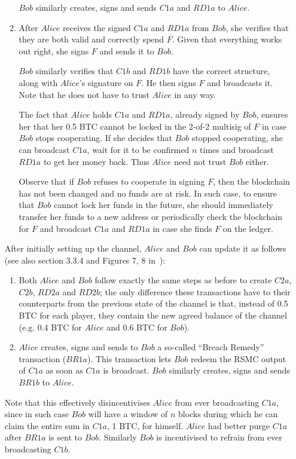 \begin{itemize}
\begin{enumerate}
      $Bob$ similarly creates, signs and sends $C1a$ and $RD1a$ to $Alice$.

      \item After $Alice$ receives the signed $C1a$ and $RD1a$ from $Bob$, she verifies
      that they are both valid and correctly spend $F$. Given that everything works out
      right, she signs $F$ and sends it to $Bob$.

      $Bob$ similarly verifies that $C1b$ and $RD1b$ have the correct structure, along
      with $Alice$'s signature on $F$. He then signs $F$ and broadcasts it. Note that he
      does not have to trust $Alice$ in any way.

      The fact that $Alice$ holds $C1a$ and $RD1a$, already signed by $Bob$, ensures her
      that her 0.5 BTC cannot be locked in the 2-of-2 multisig of $F$ in case $Bob$ stops
      cooperating. If she decides that $Bob$ stopped cooperating, she can broadcast $C1a$,
      wait for it to be confirmed $n$ times and broadcast $RD1a$ to get her money back.
      Thus $Alice$ need not trust $Bob$ either.

      Observe that if $Bob$ refuses to cooperate in signing $F$, then the blockchain has
      not been changed and no funds are at risk. In such case, to ensure that $Bob$ cannot
      lock her funds in the future, she should immediately transfer her funds to a new
      address or periodically check the blockchain for $F$ and broadcast $C1a$ and $RD1a$
      in case she finds $F$ on the ledger.

    \end{enumerate}

    After initially setting up the channel, $Alice$ and $Bob$ can update it as follows
    (see also section 3.3.4 and Figures 7, 8 in~\cite{lightning}):
    \begin{enumerate}
      \item Both $Alice$ and $Bob$ follow exactly the same steps as before to create
      $C2a$, $C2b$, $RD2a$ and $RD2b$; the only difference these transactions have to
      their counterparts from the previous state of the channel is that, instead of 0.5
      BTC for each player, they contain the new agreed balance of the channel (e.g. 0.4
      BTC for $Alice$ and 0.6 BTC for $Bob$).

      \item $Alice$ creates, signs and sends to $Bob$ a so-called ``Breach Remedy''
      transaction ($BR1a$). This transaction lets $Bob$ redeem the RSMC output of $C1a$ as
      soon as $C1a$ is broadcast. $Bob$ similarly creates, signs and sends $BR1b$ to
      $Alice$.
    \end{enumerate}
    Note that this effectively disincentivises $Alice$ from ever broadcasting $C1a$, since
    in such case $Bob$ will have a window of $n$ blocks during which he can claim the
    entire sum in $C1a$, 1 BTC, for himself. $Alice$ had better purge $C1a$ after $BR1a$
    is sent to $Bob$. Similarly $Bob$ is incentivised to refrain from ever broadcasting
    $C1b$.


\end{itemize}
